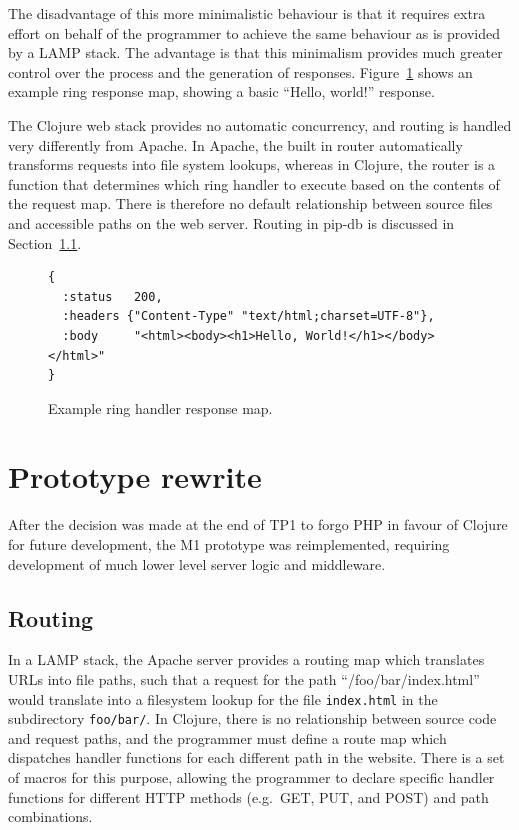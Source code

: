 The disadvantage of this more minimalistic behaviour is that it
requires extra effort on behalf of the programmer to achieve the same
behaviour as is provided by a LAMP stack. The advantage is that this
minimalism provides much greater control over the process and the
generation of responses. Figure~\ref{fig:ring-response-map} shows an
example ring response map, showing a basic ``Hello, world!'' response.

The Clojure web stack provides no automatic concurrency, and routing
is handled very differently from Apache. In Apache, the built in
router automatically transforms requests into file system lookups,
whereas in Clojure, the router is a function that determines which
ring handler to execute based on the contents of the request
map. There is therefore no default relationship between source files
and accessible paths on the web server. Routing in pip-db is discussed
in Section~\ref{subsec:routing}.


\begin{figure}[H]
\begin{verbatim}
{
  :status   200,
  :headers {"Content-Type" "text/html;charset=UTF-8"},
  :body     "<html><body><h1>Hello, World!</h1></body></html>"
}
\end{verbatim}
\caption[Example ring handler response map]
        {Example ring handler response map.}
\label{fig:ring-response-map}
\end{figure}


\newpage
\section{Prototype rewrite}\label{sec:prototype-rewrite}

After the decision was made at the end of TP1 to forgo PHP in favour
of Clojure for future development, the M1 prototype was reimplemented,
requiring development of much lower level server logic and middleware.

\subsection{Routing}\label{subsec:routing}

In a LAMP stack, the Apache server provides a routing map which
translates URLs into file paths, such that a request for the path
``/foo/bar/index.html'' would translate into a filesystem lookup for
the file \texttt{index.html} in the subdirectory \texttt{foo/bar/}. In
Clojure, there is no relationship between source code and request
paths, and the programmer must define a route map which dispatches
handler functions for each different path in the website. There is a
set of macros for this purpose, allowing the programmer to declare
specific handler functions for different HTTP methods (e.g.\ GET, PUT,
and POST) and path combinations.

